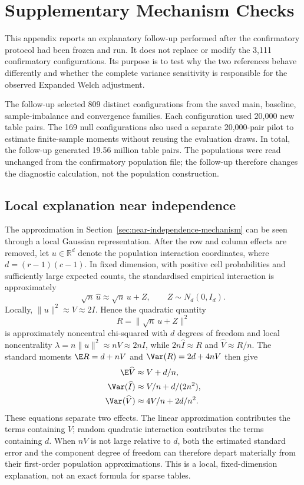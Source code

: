 \chapter{Supplementary Mechanism Checks}
\label{app:mechanism}

This appendix reports an explanatory follow-up performed after the
confirmatory protocol had been frozen and run. It does not replace or modify
the 3,111 confirmatory configurations. Its purpose is to test why the two
references behave differently and whether the complete variance sensitivity
is responsible for the observed Expanded Welch adjustment.

The follow-up selected 809 distinct configurations from the saved main,
baseline, sample-imbalance and convergence families. Each configuration used
20,000 new table pairs. The 169 null configurations also used a separate
20,000-pair pilot to estimate finite-sample moments without reusing the
evaluation draws. In total, the follow-up generated 19.56 million table
pairs. The populations were read unchanged from the confirmatory population
file; the follow-up therefore changes the diagnostic calculation, not the
population construction.

\section{Local explanation near independence}

The approximation in Section~\ref{sec:near-independence-mechanism} can be
seen through a local Gaussian representation. After the row and column
effects are removed, let \(u\in\mathbb R^d\) denote the population
interaction coordinates, where \(d=(r-1)(c-1)\). In fixed dimension, with
positive cell probabilities and sufficiently large expected counts, the
standardised empirical interaction is approximately
\begin{equation}
  \sqrt n\,\widehat u \approx \sqrt n\,u+Z,
  \qquad Z\sim N_d(0,I_d).
\end{equation}
Locally, \(\lVert u\rVert^2\approx V\approx 2I\). Hence the quadratic
quantity
\begin{equation}
  R=\lVert\sqrt n\,u+Z\rVert^2
\end{equation}
is approximately noncentral chi-squared with \(d\) degrees of freedom and
local noncentrality
\(\lambda=n\lVert u\rVert^2\approx nV\approx2nI\), while
\(2n\widehat I\approx R\) and
\(\widehat V\approx R/n\). The standard moments
\(\E R=d+nV\) and \(\Var(R)=2d+4nV\) then give
\begin{align}
  \E\widehat V&\approx V+d/n,\\
  \Var(\widehat I)&\approx V/n+d/(2n^2),\\
  \Var(\widehat V)&\approx 4V/n+2d/n^2.
\end{align}
These equations separate two effects. The linear approximation contributes
the terms containing \(V\); random quadratic interaction contributes the
terms containing \(d\). When \(nV\) is not large relative to \(d\), both the
estimated standard error and the component degree of freedom can therefore
depart materially from their first-order population approximations. This is
a local, fixed-dimension explanation, not an exact formula for sparse tables.

